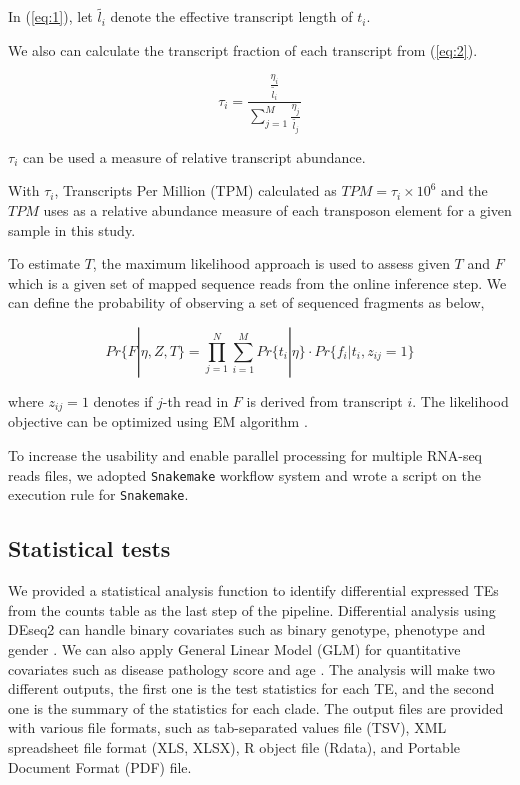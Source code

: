 \documentclass{ws-procs11x85}
\begin{document}
In (\ref{eq:1}), let $\widetilde{l_i}$ denote the effective transcript length of $t_i$\cite{li2009rna}.

We also can calculate the transcript fraction of each transcript from (\ref{eq:2}).

\begin{equation} \label{eq:2}
\tau_i = \frac{ \frac{\eta_i }{\widetilde{l_i}} }
{\sum_{j=1}^{M} \frac{\eta_j }{\widetilde{l_j}} }
\end{equation}

$\tau_i$ can be used a measure of relative transcript abundance.

With $\tau_i$, Transcripts Per Million (TPM) calculated as $TPM=\tau_i \times 10^6$ and the $TPM$ uses as a relative abundance measure of each transposon element for a given sample in this study.

To estimate $T$, the maximum likelihood approach is used to assess given $T$ and $F$ which is a given set of mapped sequence reads from 
the online inference step.
We can define the probability of observing a set of sequenced fragments as below,

\begin{equation} \label{eq:3}
Pr\{F|\eta,Z, T \}=
\prod_{j=1}^{N}\sum_{i=1}^{M} Pr\{ t_i | \eta \}  \cdot
 Pr \{ f_i | t_i , z_{ij} = 1 \}
\end{equation}

where $z_{ij} = 1$ denotes if $j$-th read in $F$ is derived from transcript $i$. The likelihood objective can be optimized using EM algorithm \cite{li2009rna}.

To increase the usability and enable parallel processing for multiple RNA-seq reads files, we adopted \verb|Snakemake| workflow system and wrote a script on the execution rule for \verb|Snakemake|.\cite{koster2012snakemake}

\subsection{Statistical tests}
We provided a statistical analysis function to identify differential expressed TEs from the counts table as the last step of the pipeline. 
Differential analysis using DEseq2 can handle  binary covariates such as binary genotype, phenotype and gender \cite{love2014moderated}. We can also apply General Linear Model (GLM) for quantitative covariates such as disease pathology score and age \cite{johnston1980multivariate}. The analysis will make two different outputs, 
the first one is the test statistics for each TE, and the second one is the summary of the statistics for each clade. 
The output files are provided with various file formats, such as tab-separated values file (TSV), XML spreadsheet file format (XLS, XLSX), R object file (Rdata), and Portable Document Format (PDF) file.
\end{document}
